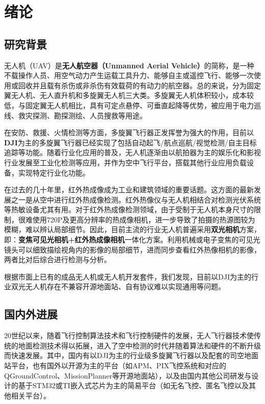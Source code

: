 \chapter{绪论}
\section{研究背景}

无人机（UAV）是\textbf{无人航空器（Unmanned Aerial Vehicle）}的简称，是一种不载操作人员、用空气动力产生运载工具升力、能够自主或遥控飞行、能够一次使用或回收并且载有杀伤或非杀伤有效载荷的有动力的航空器。总的来说，分为固定翼无人机、无人直升机和多旋翼无人机三大类。多旋翼无人机体积较小，成本较低，与固定翼无人机相比，具有可定点悬停、可垂直起降等优势，被应用于电力巡线、救灾探测、勘探测绘、人员搜救等用途。

在安防、救援、火情检测等方面，多旋翼飞行器正发挥誉为强大的作用，目前以\textbf{DJI}为主的多旋翼飞行器已经实现了包括自动起飞/航点巡航/视觉检测/自主目标追踪等功能。随着行业化应用的普及，无人机逐渐由以航拍器为主的娱乐化和影视行业发展至工业化检测等应用，并作为空中飞行平台，搭载其他行业应用负载设备，实现特定行业化功能。

在过去的几十年里，红外热成像成为工业和建筑领域的重要话题。这方面的最新发展之一是从空中进行红外热成像检测。红外热像仪与无人机相结合对检测光伏系统等热敏设备尤其有用。对于红外热成像检测领域，由于受制于无人机本身尺寸的限制，很难使用720P及更高分辨率的热成像相机，进一步导致了拍摄的热源图较为模糊，难以辨认局部细节。因此，目前主流的行业无人机普遍采用\textbf{双光相机}方案，即：\textbf{变焦可见光相机+红外热成像相机}一体化方案。利用机械或电子变焦的可见光镜头可以细致描绘视角内的影像的局部细节，进而同步查看红外热像相机的影像，两者比对后综合进行检测与分析。

根据市面上已有的成品无人机或无人机开发套件，我们发现，目前以DJI为主的行业双光无人机存在不兼容开源地面站、自有协议难以实现通用等问题。

\section{国内外进展}

20世纪以来，随着飞行控制算法技术和飞行控制硬件的发展，无人飞行器技术使传统的地面检测技术得以拓展，进入了空中检测的时代并随着算法和硬件的不断升级而快速发展。其中，国内有以DJI为主的行业级多旋翼飞行器以及配套的司空地面站平台，也有国外以开源为主的平台（如APM、PIX飞控系统和对应的QGroundControl、MissionPlanner等开源地面站），以及由国内其他公司研发与设计的基于STM32或TI嵌入式芯片为主的简易平台（如无名飞控、匿名飞控以及其他相关平台）。

